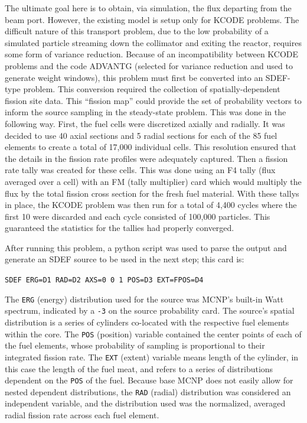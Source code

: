 The ultimate goal here is to obtain, via simulation, the flux departing from the beam port.
However, the existing model is setup only for KCODE problems.
The difficult nature of this transport problem, due to the low probability of a simulated particle streaming down the collimator and exiting the reactor, requires some form of variance reduction.
Because of an incompatibility between KCODE problems and the code ADVANTG (selected for variance reduction and used to generate weight windows), this problem must first be converted into an SDEF-type problem.
This conversion required the collection of spatially-dependent fission site data.
This ``fission map'' could provide the set of probability vectors to inform the source sampling in the steady-state problem.
This was done in the following way.
First, the fuel cells were discretized axially and radially.
It was decided to use 40 axial sections and 5 radial sections for each of the 85 fuel elements to create a total of 17,000 individual cells.
This resolution ensured that the details in the fission rate profiles were adequately captured.
Then a fission rate tally was created for these cells.
This was done using an F4 tally (flux averaged over a cell) with an FM (tally multiplier) card which would multiply the flux by the total fission cross section for the fresh fuel material.
With these tallys in place, the KCODE problem was then run for a total of 4,400 cycles where the first 10 were discarded and each cycle consisted of 100,000 particles.
This guaranteed the statistics for the tallies had properly converged.

After running this problem, a python script was used to parse the output and generate an SDEF source to be used in the next step; this card is:

\begin{center}
{\tt SDEF ERG=D1 RAD=D2  AXS=0 0 1  POS=D3  EXT=FPOS=D4}
\end{center}

\noindent
The {\tt ERG} (energy) distribution used for the source was MCNP's built-in Watt spectrum, indicated by a {\tt -3} on the source probability card.
The source's spatial distribution is a series of cylinders co-located with the respective fuel elements within the core.
The {\tt POS} (position) variable contained the center points of each of the fuel elements, whose probability of sampling is proportional to their integrated fission rate.
The {\tt EXT} (extent) variable means length of the cylinder, in this case the length of the fuel meat, and refers to a series of distributions dependent on the {\tt POS} of the fuel.
Because base MCNP does not easily allow for nested dependent distributions, the {\tt RAD} (radial) distribution was considered an independent variable, and the distribution used was the normalized, averaged radial fission rate across each fuel element.

